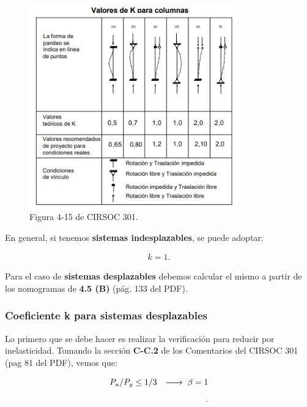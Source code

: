 \documentclass[../main.tex]{subfiles}
\begin{document}
\begin{figure}[htpb]
  \centering
  \includegraphics[width=0.8\textwidth]{../images/resumen/k_aprox}
  \caption{Figura 4-15 de CIRSOC 301.}
  \label{fig:k_aprox}
\end{figure}
 
En general, si tenemos \textbf{sistemas indesplazables}, se puede adoptar:

\begin{align*}
  k = 1 \tag{para sistemas indesplazables}
.\end{align*}

Para el caso de \textbf{sistemas desplazables} debemos calcular el mismo a
partir de los nomogramas de \textbf{4.5 (B)} (pág. 133 del PDF).

\subsubsection{Coeficiente k para sistemas desplazables}

Lo primero que se debe hacer es realizar la verificación para reducir por
inelasticidad. Tomando la sección \textbf{C-C.2} de los Comentarios del CIRSOC
301 (pag 81 del PDF), vemos que:

\begin{align*}
  P_{u} / P_{y} \leq 1/3 \hspace{0.25cm} \xrightarrow{\hspace*{0.5cm}} \hspace{0.1cm} \beta = 1 \\[5pt] 
.\end{align*}
\end{document}
